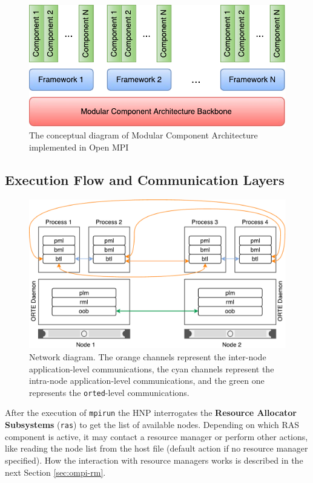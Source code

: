 \begin{figure}[t]
		\centerline 
{\includegraphics[scale=0.8]{img/cap3-mca.pdf}}
		\caption[Open MPI: Modular Component Architecture]{The conceptual diagram of Modular Component Architecture
                 implemented in Open MPI}
		\label{fig:cap3a-mca}
\end{figure}

\subsection{Execution Flow and Communication Layers}

\begin{figure}[t]
		\centerline 
{\includegraphics[scale=0.6]{img/cap3-networkdiagram.pdf}}
		\caption[Open MPI: Network connections]{Network diagram. The orange channels represent the inter-node
                 application-level communications, the cyan channels represent
                 the intra-node application-level communications, and the green
                 one represents the \texttt{orted}-level communications.}
		\label{fig:cap3-networkdiagram}
\end{figure}
After the execution of \texttt{mpirun} the HNP interrogates the
\textbf{Resource Allocator Subsystems} (\texttt{ras}) to get the list of
available nodes.
Depending on which RAS component is active, it may contact a resource manager
or perform other actions, like reading the node list from the host file (default
action if no resource manager specified). How the interaction with resource
managers works is described in the next Section \ref{sec:ompi-rm}.


